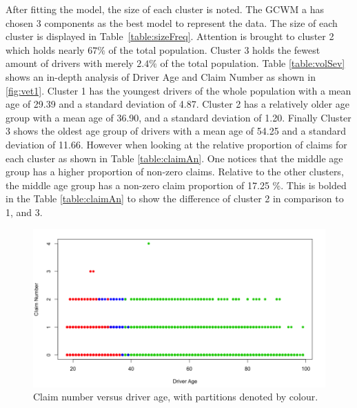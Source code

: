 \documentclass[11pt,letterpaper]{article}
\numberwithin{equation}{section}
\numberwithin{equation}{section}
\numberwithin{equation}{section}
\begin{document}
After fitting the model, the size of each cluster is noted. The GCWM a has chosen 3 components as the best model to represent the data. The size of each cluster is displayed in Table~\ref{table:sizeFreq}. %
Attention is brought %
to cluster 2 which holds nearly $67 \%$ of the total population. Cluster 3 holds the fewest amount of drivers with merely $2.4 \% $ of the total population. Table \ref{table:volSev} shows an in-depth analysis of Driver Age and Claim Number as shown in \ref{fig:vet1}.  Cluster 1 has the youngest drivers of the whole population with a mean age of 29.39 and a standard deviation of 4.87. Cluster 2 has a relatively older age group with a mean age of 36.90, and a standard deviation of 1.20. Finally Cluster 3 shows the oldest age group of drivers with a mean age of 54.25 and a standard deviation of 11.66. However when looking at the relative proportion of claims for each cluster as shown in Table \ref{table:claimAn}. One notices that the middle age group has a higher proportion of non-zero claims. Relative to the other clusters, the middle age group has a non-zero claim proportion of 17.25 \%. This is bolded in the Table \ref{table:claimAn} to show the difference of cluster 2 in comparison to 1, and 3.
\begin{figure}[!htb]
\label{figure:3}
\begin{center}
\includegraphics[scale=0.25]{driverVClaimNumber.png}
\end{center}
\caption{Claim number versus driver age, with partitions denoted by colour.}
\end{figure}
\end{document}
